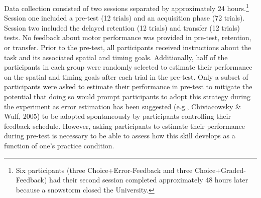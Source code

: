 \documentclass[
  man, donotrepeattitle,floatsintext]{apa7}
\begin{document}
Data collection consisted of two sessions separated by approximately 24 hours.\footnote{Six participants (three Choice+Error-Feedback and three Choice+Graded-Feedback) had their second session completed approximately 48 hours later because a snowstorm closed the University.} Session one included a pre-test (12 trials) and an acquisition phase (72 trials). Session two included the delayed retention (12 trials) and transfer (12 trials) tests. No feedback about motor performance was provided in pre-test, retention, or transfer. Prior to the pre-test, all participants received instructions about the task and its associated spatial and timing goals. Additionally, half of the participants in each group were randomly selected to estimate their performance on the spatial and timing goals after each trial in the pre-test. Only a subset of participants were asked to estimate their performance in pre-test to mitigate the potential that doing so would prompt participants to adopt this strategy during the experiment as error estimation has been suggested (e.g., Chiviacowsky \& Wulf, 2005) to be adopted spontaneously by participants controlling their feedback schedule. However, asking participants to estimate their performance during pre-test is necessary to be able to assess how this skill develops as a function of one's practice condition.
\end{document}
